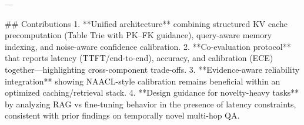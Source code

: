 ---

## Contributions  
1. **Unified architecture** combining structured KV cache precomputation (Table Trie with PK–FK guidance), query-aware memory indexing, and noise-aware confidence calibration.  
2. **Co-evaluation protocol** that reports latency (TTFT/end-to-end), accuracy, and calibration (ECE) together—highlighting cross-component trade-offs.  
3. **Evidence-aware reliability integration** showing NAACL-style calibration remains beneficial within an optimized caching/retrieval stack.  
4. **Design guidance for novelty-heavy tasks** by analyzing RAG vs fine-tuning behavior in the presence of latency constraints, consistent with prior findings on temporally novel multi-hop QA.